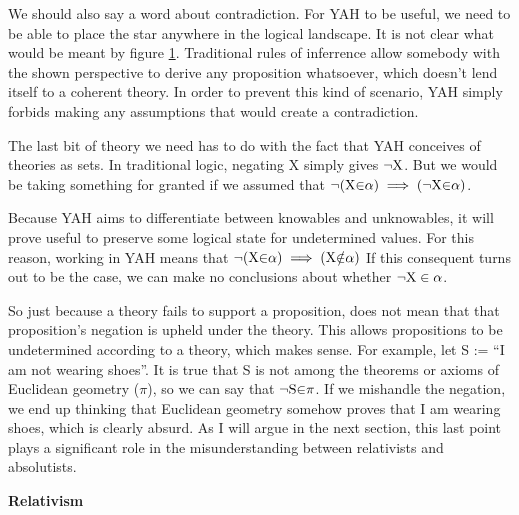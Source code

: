 \documentclass[12pt]{article}
\begin{document}
\begin{flushleft}
\begin{figure}[h]
    \centering
    \hspace*{17em}%
    \fitchprf
    {
    }
    {
        \subproof
        {
        }
        {
            \pline{\bigstar}
        }
    }
    \caption{}
    \label{contradiction}
\end{figure}

We should also say a word about contradiction.
For YAH to be useful, we need to be able to place the star anywhere in the logical landscape.
It is not clear what would be meant by figure \ref{contradiction}.
Traditional rules of inferrence allow somebody with the shown perspective to derive any proposition whatsoever, which doesn't lend itself to a coherent theory.
In order to prevent this kind of scenario, YAH simply forbids making any assumptions that would create a contradiction.

The last bit of theory we need has to do with the fact that YAH conceives of theories as sets.
In traditional logic, negating X simply gives ${\neg}\textnormal{X}$.
But we would be taking something for granted if we assumed that ${\neg}(\textnormal{X}{\in} \alpha) \implies ({\neg}\textnormal{X}{\in} \alpha)$.

Because YAH aims to differentiate between knowables and unknowables, it will prove useful to preserve some logical state for undetermined values.
For this reason, working in YAH means that ${\neg}(\textnormal{X}{\in} \alpha) \implies (\textnormal{X}{\notin} \alpha)$
If this consequent turns out to be the case, we can make no conclusions about whether ${\neg}\textnormal{X} \in \alpha$.

So just because a theory fails to support a proposition, does not mean that that proposition's negation is upheld under the theory.
This allows propositions to be undetermined according to a theory, which makes sense.
For example, let S :=  ``I am not wearing shoes''.
It is true that S is not among the theorems or axioms of Euclidean geometry ($\pi$), so we can say that ${\neg}\textnormal{S}{\in} \pi$.
If we mishandle the negation, we end up thinking that Euclidean geometry somehow proves that I am wearing shoes, which is clearly absurd.
As I will argue in the next section, this last point plays a significant role in the misunderstanding between relativists and absolutists.


\setlength{\parindent}{0in}
\par\bigskip
\textbf{Relativism}
\setlength{\parindent}{0.5in}


\end{flushleft}
\end{document}

